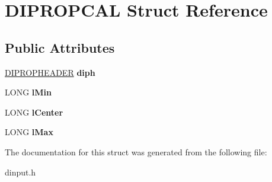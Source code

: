 \hypertarget{struct_d_i_p_r_o_p_c_a_l}{\section{D\-I\-P\-R\-O\-P\-C\-A\-L Struct Reference}
\label{struct_d_i_p_r_o_p_c_a_l}
}
\subsection*{Public Attributes}
\begin{DoxyCompactItemize}
\item 
\hypertarget{struct_d_i_p_r_o_p_c_a_l_a6e042f3c72c54370265076c31e6ba05d}{\hyperlink{struct_d_i_p_r_o_p_h_e_a_d_e_r}{D\-I\-P\-R\-O\-P\-H\-E\-A\-D\-E\-R} {\bfseries diph}}\label{struct_d_i_p_r_o_p_c_a_l_a6e042f3c72c54370265076c31e6ba05d}

\item 
\hypertarget{struct_d_i_p_r_o_p_c_a_l_a3fbe0e69961bdb6b14079d0743d70316}{L\-O\-N\-G {\bfseries l\-Min}}\label{struct_d_i_p_r_o_p_c_a_l_a3fbe0e69961bdb6b14079d0743d70316}

\item 
\hypertarget{struct_d_i_p_r_o_p_c_a_l_a4f4a53d45f0835f0cd70f7942c6e1ee2}{L\-O\-N\-G {\bfseries l\-Center}}\label{struct_d_i_p_r_o_p_c_a_l_a4f4a53d45f0835f0cd70f7942c6e1ee2}

\item 
\hypertarget{struct_d_i_p_r_o_p_c_a_l_aa6153838f6649d8d04dec8988c5e30fc}{L\-O\-N\-G {\bfseries l\-Max}}\label{struct_d_i_p_r_o_p_c_a_l_aa6153838f6649d8d04dec8988c5e30fc}

\end{DoxyCompactItemize}


The documentation for this struct was generated from the following file\-:\begin{DoxyCompactItemize}
\item 
dinput.\-h\end{DoxyCompactItemize}

